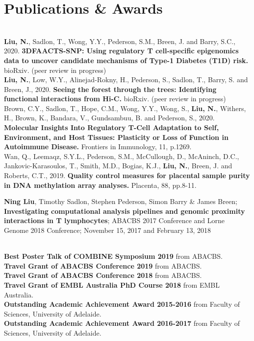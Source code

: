 \documentclass[]{deedy-resume-openfont}
\begin{document}
\section{Publications \& Awards}
\\
\textbf{Liu, N.}, Sadlon, T., Wong, Y.Y., Pederson, S.M., Breen, J. and Barry, S.C., 2020. \textbf{3DFAACTS-SNP: Using regulatory T cell-specific epigenomics data to uncover candidate mechanisms of Type-1 Diabetes (T1D) risk.} bioRxiv. (peer review in progress)\\ 
\textbf{Liu, N.}, Low, W.Y., Alinejad-Rokny, H., Pederson, S., Sadlon, T., Barry, S. and Breen, J., 2020. \textbf{Seeing the forest through the trees: Identifying functional interactions from Hi-C.} bioRxiv. (peer review in progress)\\
Brown, C.Y., Sadlon, T., Hope, C.M., Wong, Y.Y., Wong, S., \textbf{Liu, N.}, Withers, H., Brown, K., Bandara, V., Gundsambuu, B. and Pederson, S., 2020. \textbf{Molecular Insights Into Regulatory T-Cell Adaptation to Self, Environment, and Host Tissues: Plasticity or Loss of Function in Autoimmune Disease. }Frontiers in Immunology, 11, p.1269.\\
Wan, Q., Leemaqz, S.Y.L., Pederson, S.M., McCullough, D., McAninch, D.C., Jankovic-Karasoulos, T., Smith, M.D., Bogias, K.J., \textbf{Liu, N.}, Breen, J. and Roberts, C.T., 2019. \textbf{Quality control measures for placental sample purity in DNA methylation array analyses.} Placenta, 88, pp.8-11.\\

\sectionsep

\textbf{Ning Liu}, Timothy Sadlon, Stephen Pederson, Simon Barry \& James Breen; \textbf{Investigating computational analysis pipelines and genomic proximity interactions in T lymphocytes}; ABACBS 2017 Conference and Lorne Genome 2018 Conference; November 15, 2017 and February 13, 2018\\ 
\sectionsep

\\
\textbf{Best Poster Talk of COMBINE Symposium 2019} from ABACBS.\\
\textbf{Travel Grant of ABACBS Conference 2019} from ABACBS.\\
\textbf{Travel Grant of ABACBS Conference 2018} from ABACBS.\\
\textbf{Travel Grant of EMBL Australia PhD Course 2018} from EMBL Australia.\\
\textbf{Outstanding Academic Achievement Award 2015-2016} from Faculty of Sciences, University of Adelaide.\\
\textbf{Outstanding Academic Achievement Award 2016-2017} from Faculty of Sciences, University of Adelaide.\\
\sectionsep
\end{document}
